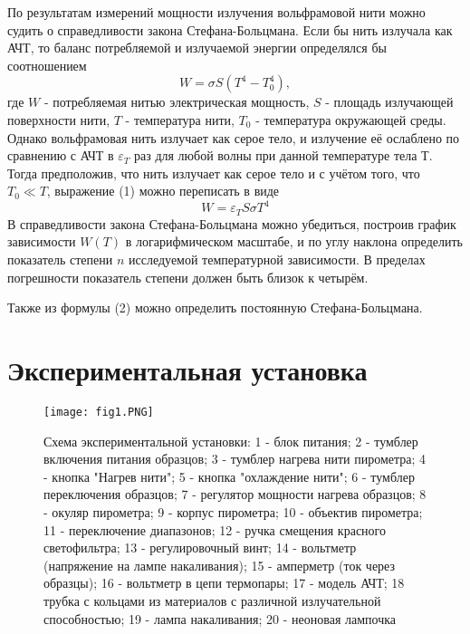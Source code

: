 \documentclass[a4paper]{article}
\begin{document}
По результатам измерений мощности излучения вольфрамовой нити можно судить о справедливости закона Стефана-Больцмана. Если бы нить излучала как АЧТ, то баланс потребляемой и излучаемой энергии определялся бы соотношением 
\begin{equation}
    W = \sigma S (T^4 - T_0^4),
\end{equation}
где $W$ - потребляемая нитью электрическая мощность, $S$ - площадь излучающей поверхности нити, $T$ - температура нити, $T_0$ - температура окружающей среды. Однако вольфрамовая нить излучает как серое тело, и излучение её ослаблено по сравнению с АЧТ в $\varepsilon_T$ раз для любой волны при данной температуре тела Т. Тогда предположив, что нить излучает как серое тело и с учётом того, что $T_0 \ll T$, выражение (1) можно переписать в виде
\begin{equation}
    W = \varepsilon_T S \sigma T^4
\end{equation}
В справедливости закона Стефана-Больцмана можно убедиться, построив график зависимости $W(T)$ в логарифмическом масштабе, и по углу наклона определить показатель степени $n$ исследуемой температурной зависимости. В пределах погрешности показатель степени должен быть близок к четырём. \par
Также из формулы (2) можно определить постоянную Стефана-Больцмана.

\newpage

\section{Экспериментальная установка}

\begin{figure}[h]
    \centering
    \texttt{[image: fig1.PNG]}
    \caption{Схема экспериментальной установки: 1 - блок питания; 2 - тумблер включения питания образцов; 3 - тумблер нагрева нити пирометра; 4 - кнопка "Нагрев нити"; 5 - кнопка "охлаждение нити"; 6 - тумблер переключения образцов; 7 - регулятор мощности нагрева образцов; 8 - окуляр пирометра; 9 - корпус пирометра; 10 - объектив пирометра; 11 - переключение диапазонов; 12 - ручка смещения красного светофильтра; 13 - регулировочный винт; 14 - вольтметр (напряжение на лампе накаливания); 15 - амперметр (ток через образцы); 16 - вольтметр в цепи термопары; 17 - модель АЧТ; 18 трубка с кольцами из материалов с различной излучательной способностью; 19 - лампа накаливания; 20 - неоновая лампочка}
    \label{fig:vac}
\end{figure}
\end{document}
